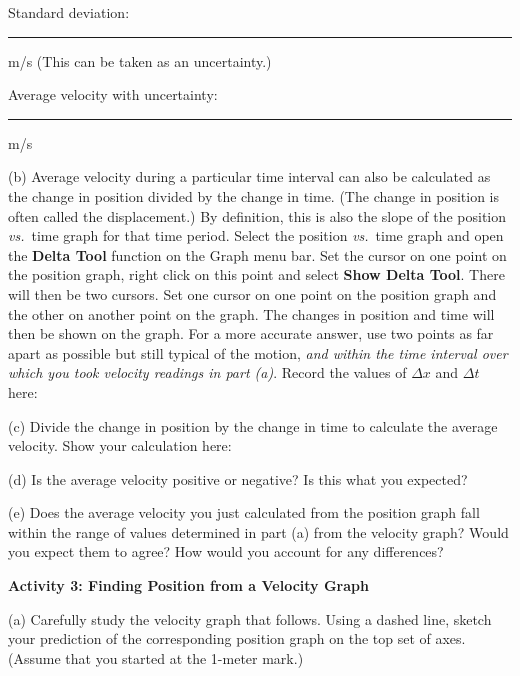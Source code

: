 Standard deviation: \rule{1.0in}{0.1pt} m/s     (This can be taken as an uncertainty.)

Average velocity with uncertainty: \rule{1.5in}{0.1pt} m/s

(b) Average velocity during a particular time interval can also be calculated
as the change in position divided by the change in time. (The change in position
is often called the displacement.) By definition, this is also the slope of
the position \textit{vs.}~time graph for that time period. Select the position \textit{vs.}~time graph and open the \textbf{Delta Tool} function on the Graph menu bar.  Set the cursor on one point on the position graph, right click on this point and select \textbf{Show Delta Tool}.  There will then be two cursors.  Set one cursor on one point on the position graph and the other on another point on the graph.  The changes in position and time will then be shown on the graph.  For a more accurate answer, use two points as far apart
as possible but still typical of the motion, \emph{and within the time 
interval over which you took velocity readings in part (a)}. Record the values of \( \Delta x\) and \( \Delta t\) here:
\answerspace{10mm}

(c) Divide the change in position by the change in time to calculate the average velocity.  Show your calculation here:
\answerspace{15mm}

(d) Is the average velocity positive or negative? Is this what you expected? 
\answerspace{15mm}

\pagebreak[2]
(e) Does the average velocity you just calculated from the position graph fall within the range of values determined in part (a) from the velocity graph? Would you expect them to agree? How would you account for any differences?
\vspace{20mm}

\textbf{Activity 3: Finding Position from a Velocity Graph }

(a) Carefully study the velocity graph that follows. Using a dashed line, sketch your prediction of the corresponding position graph on the top set of axes.
(Assume that you started at the 1-meter mark.)


